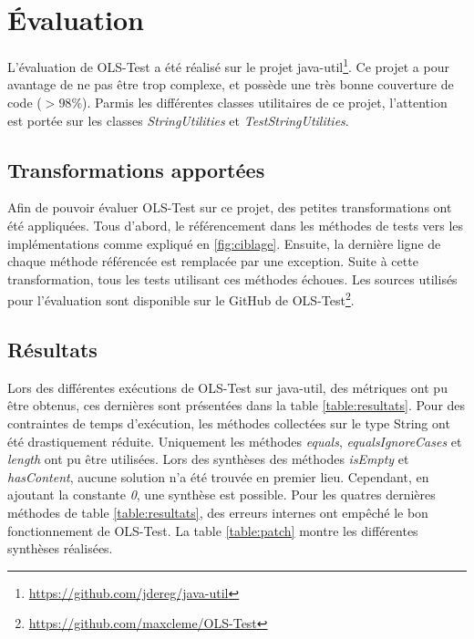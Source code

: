
\chapter{Évaluation}
	\thispagestyle{document}
	
\par L'évaluation de OLS-Test a été réalisé sur le projet java-util\footnote{\url{https://github.com/jdereg/java-util}}. Ce projet a pour avantage de ne pas être trop complexe, et possède une très bonne couverture de code ($ >98\% $). Parmis les différentes classes utilitaires de ce projet, l'attention est portée sur les classes \textit{StringUtilities} et \textit{TestStringUtilities}.

\section{Transformations apportées}

\par Afin de pouvoir évaluer OLS-Test sur ce projet, des petites transformations ont été appliquées. Tous d'abord, le référencement dans les méthodes de tests vers les implémentations comme expliqué en \ref{fig:ciblage}. Ensuite, la dernière ligne de chaque méthode référencée est remplacée par une exception. Suite à cette transformation, tous les tests utilisant ces méthodes échoues. Les sources utilisés pour l'évaluation sont disponible sur le GitHub de OLS-Test\footnote{\url{https://github.com/maxcleme/OLS-Test}}.


\section{Résultats}

\par Lors des différentes exécutions de OLS-Test sur java-util, des métriques ont pu être obtenus, ces dernières sont présentées dans la table \ref{table:resultats}. Pour des contraintes de temps d'exécution, les méthodes collectées sur le type String ont été drastiquement réduite. Uniquement les méthodes \textit{equals}, \textit{equalsIgnoreCases} et \textit{length} ont pu être utilisées. Lors des synthèses des méthodes \textit{isEmpty} et \textit{hasContent}, aucune solution n'a été trouvée en premier lieu. Cependant, en ajoutant la constante \textit{0}, une synthèse est possible. Pour les quatres dernières méthodes de table \ref{table:resultats}, des erreurs internes ont empêché le bon fonctionnement de OLS-Test. La table \ref{table:patch} montre les différentes synthèses réalisées.

